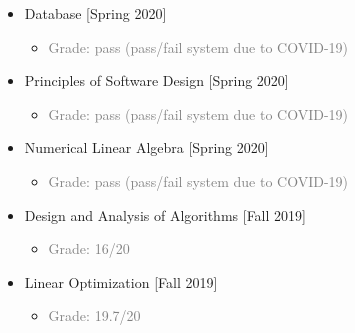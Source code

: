 \documentclass[10pt,a4paper,sans]{moderncv} %
\begin{document}
\begin{multicols}{2}
\begin{itemize}
			\item {} Database \hfill[Spring 2020]
			\begin{itemize}
			    \item \textcolor{gray}{Grade: pass (pass/fail system due to COVID-19)}
			\end{itemize}
			\vspace{0.25em}
			
			\item {} Principles of Software Design \hfill[Spring 2020]
			\begin{itemize}
			    \item \textcolor{gray}{Grade: pass (pass/fail system due to COVID-19)}
			\end{itemize}			
			\vspace{0.5em}
			
			\item {} Numerical Linear Algebra \hfill[Spring 2020]
			\begin{itemize}
			    \item \textcolor{gray}{Grade: pass (pass/fail system due to COVID-19)}
			\end{itemize}
			\vspace{0.5em}
			
			\item {} Design and Analysis of Algorithms \hfill[Fall 2019]
			\begin{itemize}
			    \item \textcolor{gray}{Grade: 16/20}
			\end{itemize}
			\vspace{0.5em}
			
			\item {} Linear Optimization \hfill[Fall 2019]
			\begin{itemize}
			    \item \textcolor{gray}{Grade: 19.7/20}
			\end{itemize}
			\vspace{0.5em}
			

\end{itemize}
\end{multicols}
\end{document}

